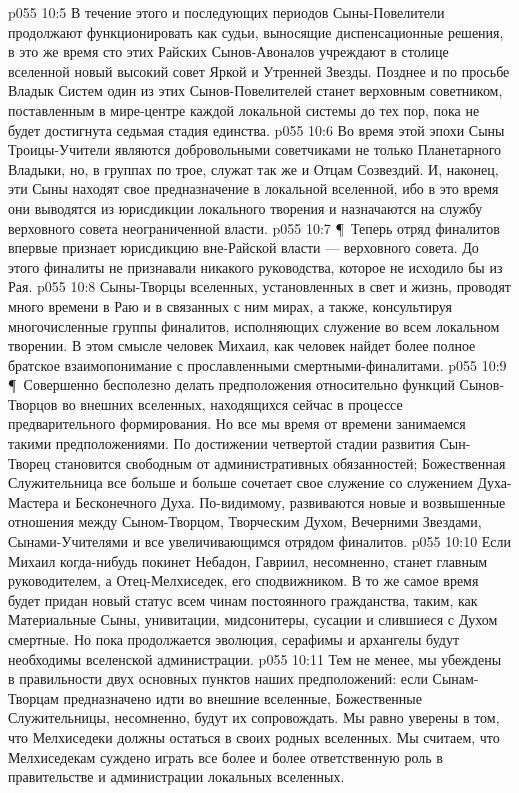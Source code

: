 \vs p055 10:5 В течение этого и последующих периодов Сыны\hyp{}Повелители продолжают функционировать как судьи, выносящие диспенсационные решения, в это же время сто этих Райских Сынов\hyp{}Авоналов учреждают в столице вселенной новый высокий совет Яркой и Утренней Звезды. Позднее и по просьбе Владык Систем один из этих Сынов\hyp{}Повелителей станет верховным советником, поставленным в мире\hyp{}центре каждой локальной системы до тех пор, пока не будет достигнута седьмая стадия единства.
\vs p055 10:6 Во время этой эпохи Сыны Троицы\hyp{}Учители являются добровольными советчиками не только Планетарного Владыки, но, в группах по трое, служат так же и Отцам Созвездий. И, наконец, эти Сыны находят свое предназначение в локальной вселенной, ибо в это время они выводятся из юрисдикции локального творения и назначаются на службу верховного совета неограниченной власти.
\vs p055 10:7 \P\ Теперь отряд финалитов впервые признает юрисдикцию вне\hyp{}Райской власти --- верховного совета. До этого финалиты не признавали никакого руководства, которое не исходило бы из Рая.
\vs p055 10:8 Сыны\hyp{}Творцы вселенных, установленных в свет и жизнь, проводят много времени в Раю и в связанных с ним мирах, а также, консультируя многочисленные группы финалитов, исполняющих служение во всем локальном творении. В этом смысле человек Михаил, как человек найдет более полное братское взаимопонимание с прославленными смертными\hyp{}финалитами.
\vs p055 10:9 \P\ Совершенно бесполезно делать предположения относительно функций Сынов\hyp{}Творцов во внешних вселенных, находящихся сейчас в процессе предварительного формирования. Но все мы время от времени занимаемся такими предположениями. По достижении четвертой стадии развития Сын\hyp{}Творец становится свободным от административных обязанностей; Божественная Служительница все больше и больше сочетает свое служение со служением Духа\hyp{}Мастера и Бесконечного Духа. По\hyp{}видимому, развиваются новые и возвышенные отношения между Сыном\hyp{}Творцом, Творческим Духом, Вечерними Звездами, Сынами\hyp{}Учителями и все увеличивающимся отрядом финалитов.
\vs p055 10:10 Если Михаил когда\hyp{}нибудь покинет Небадон, Гавриил, несомненно, станет главным руководителем, а Отец\hyp{}Мелхиседек, его сподвижником. В то же самое время будет придан новый статус всем чинам постоянного гражданства, таким, как Материальные Сыны, унивитации, мидсонитеры, сусации и слившиеся с Духом смертные. Но пока продолжается эволюция, серафимы и архангелы будут необходимы вселенской администрации.
\vs p055 10:11 Тем не менее, мы убеждены в правильности двух основных пунктов наших предположений: если Сынам\hyp{}Творцам предназначено идти во внешние вселенные, Божественные Служительницы, несомненно, будут их сопровождать. Мы равно уверены в том, что Мелхиседеки должны остаться в своих родных вселенных. Мы считаем, что Мелхиседекам суждено играть все более и более ответственную роль в правительстве и администрации локальных вселенных.
